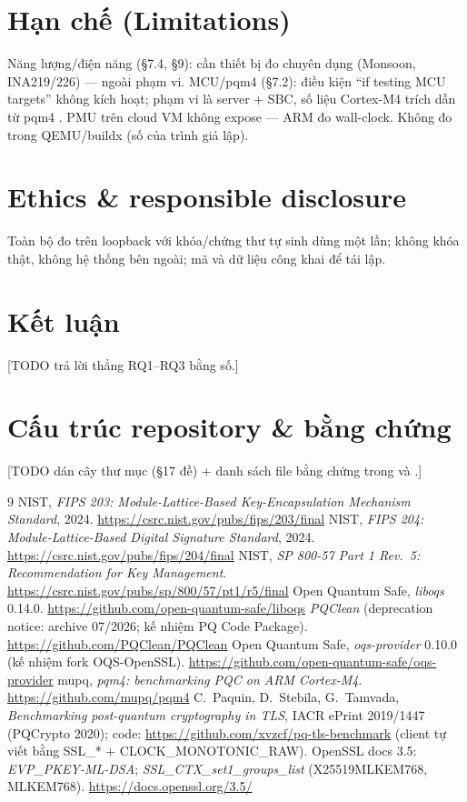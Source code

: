 \documentclass[11pt,a4paper]{article}
\newcommand{\code}[1]{\texttt{\detokenize{#1}}}
\begin{document}
\section{Hạn chế (Limitations)}
Năng lượng/điện năng (\S7.4, \S9): cần thiết bị đo chuyên dụng (Monsoon, INA219/226) --- ngoài phạm vi. MCU/pqm4 (\S7.2): điều kiện ``if testing MCU targets'' không kích hoạt; phạm vi là server + SBC, số liệu Cortex-M4 trích dẫn từ pqm4 \cite{pqm4}. PMU trên cloud VM không expose --- ARM đo wall-clock. Không đo trong QEMU/buildx (số của trình giả lập).

\section{Ethics \& responsible disclosure}
Toàn bộ đo trên loopback với khóa/chứng thư tự sinh dùng một lần; không khóa thật, không hệ thống bên ngoài; mã và dữ liệu công khai để tái lập.

\section{Kết luận}
[TODO trả lời thẳng RQ1--RQ3 bằng số.]

\appendix
\section{Cấu trúc repository \& bằng chứng}
[TODO dán cây thư mục (\S17 đề) + danh sách file bằng chứng trong \code{docs/} và \code{data/}.]

\begin{thebibliography}{9}
 NIST, \emph{FIPS 203: Module-Lattice-Based Key-Encapsulation Mechanism Standard}, 2024. \url{https://csrc.nist.gov/pubs/fips/203/final}
 NIST, \emph{FIPS 204: Module-Lattice-Based Digital Signature Standard}, 2024. \url{https://csrc.nist.gov/pubs/fips/204/final}
 NIST, \emph{SP 800-57 Part 1 Rev.~5: Recommendation for Key Management}. \url{https://csrc.nist.gov/pubs/sp/800/57/pt1/r5/final}
 Open Quantum Safe, \emph{liboqs} 0.14.0. \url{https://github.com/open-quantum-safe/liboqs}
 \emph{PQClean} (deprecation notice: archive 07/2026; kế nhiệm PQ Code Package). \url{https://github.com/PQClean/PQClean}
 Open Quantum Safe, \emph{oqs-provider} 0.10.0 (kế nhiệm fork OQS-OpenSSL). \url{https://github.com/open-quantum-safe/oqs-provider}
 mupq, \emph{pqm4: benchmarking PQC on ARM Cortex-M4}. \url{https://github.com/mupq/pqm4}
 C.~Paquin, D.~Stebila, G.~Tamvada, \emph{Benchmarking post-quantum cryptography in TLS}, IACR ePrint 2019/1447 (PQCrypto 2020); code: \url{https://github.com/xvzcf/pq-tls-benchmark} (client \code{s_timer.c} tự viết bằng SSL\_* + CLOCK\_MONOTONIC\_RAW).
 OpenSSL docs 3.5: \emph{EVP\_PKEY-ML-DSA}; \emph{SSL\_CTX\_set1\_groups\_list} (X25519MLKEM768, MLKEM768). \url{https://docs.openssl.org/3.5/}
\end{thebibliography}
\end{document}
